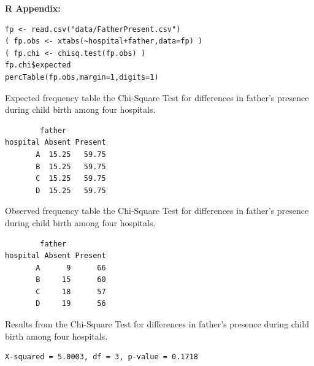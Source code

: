 \documentclass[10pt,openany]{book}\usepackage[]{graphicx}\usepackage[]{color}
\makeatletter
\newenvironment{kframe}{%
 \def\at@end@of@kframe{}%
 \ifinner\ifhmode%
  \def\at@end@of@kframe{\end{minipage}}%
  \begin{minipage}{\columnwidth}%
 \fi\fi%
 \def\FrameCommand##1{\hskip\@totalleftmargin \hskip-\fboxsep
 \colorbox{shadecolor}{##1}\hskip-\fboxsep
     \hskip-\linewidth \hskip-\@totalleftmargin \hskip\columnwidth}%
 \MakeFramed {\advance\hsize-\width
   \@totalleftmargin\z@ \linewidth\hsize
   \@setminipage}}%
 {\par\unskip\endMakeFramed%
 \at@end@of@kframe}
\newenvironment{knitrout}{}{} %
\makeatother
\begin{document}
\begin{minipage}{\textwidth}
\textbf{R Appendix:}
\begin{knitrout}
\color{fgcolor}\begin{kframe}
\begin{verbatim}
fp <- read.csv("data/FatherPresent.csv")
( fp.obs <- xtabs(~hospital+father,data=fp) )
( fp.chi <- chisq.test(fp.obs) )
fp.chi$expected
percTable(fp.obs,margin=1,digits=1)
\end{verbatim}
\end{kframe}
\end{knitrout}
\end{minipage}

\begin{table}[h]
  \caption{Expected frequency table the Chi-Square Test for differences in father's presence during child birth among four hospitals.}
  \label{tab:ChiFPexp}
  \vspace{-12pt}
\begin{knitrout}
\color{fgcolor}\begin{kframe}
\begin{verbatim}
        father
hospital Absent Present
       A  15.25   59.75
       B  15.25   59.75
       C  15.25   59.75
       D  15.25   59.75
\end{verbatim}
\end{kframe}
\end{knitrout}
\end{table}

\begin{table}[h]
  \caption{Observed frequency table the Chi-Square Test for differences in father's presence during child birth among four hospitals.}
  \label{tab:ChiFPobs}
  \vspace{-12pt}
\begin{knitrout}
\color{fgcolor}\begin{kframe}
\begin{verbatim}
        father
hospital Absent Present
       A      9      66
       B     15      60
       C     18      57
       D     19      56
\end{verbatim}
\end{kframe}
\end{knitrout}
\end{table}

\begin{table}[h]
  \caption{Results from the Chi-Square Test for differences in father's presence during child birth among four hospitals.}
  \label{tab:ChiFPchi}
  \vspace{-12pt}
\begin{knitrout}
\color{fgcolor}\begin{kframe}
\begin{verbatim}
X-squared = 5.0003, df = 3, p-value = 0.1718
\end{verbatim}
\end{kframe}
\end{knitrout}
\end{table}
\end{document}
